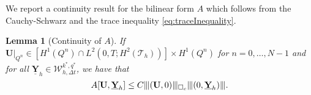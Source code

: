 \documentclass[sn-mathphys-num]{sn-jnl}
\newtheorem{lem}[thm]{Lemma}
\numberwithin{equation}{section}
\newcommand{\wop}{\square_c}
\newcommand{\tnorm}[1]{\vert\hspace{-0.3mm}\Vert#1\Vert\hspace{-0.3mm}\vert}
\newcommand{\dT}{\mathrm{d}t}
\newcommand{\ProdFullyDiscrSpace}[2]{ \mathcal{W}^{ {#1},{#2}}_{h, \Delta t  } }
\newcommand{\Yh}{\underline{\mathbf{Y}}_h}
\newcommand{\dt}{\partial_t}
\begin{document}
We report a continuity result for the bilinear form $A$ which follows from the Cauchy-Schwarz and the trace inequality \eqref{eq:traceInequality}. 
\begin{lem}[Continuity of $A$]\label{lem:continuityA}
If $\mathbf{U}|_{Q^n} \in [H^1(Q^n) \cap L^2(0,T;H^2(\mathcal{T}_h))] \times H^1(Q^n)$ for $n=0,\ldots,N-1$ and for all $\Yh \in \ProdFullyDiscrSpace{k^\ast}{q^\ast}$, we have that 
    \begin{equation*}
        A[\mathbf{U},\Yh] \le C \tnorm{(\mathbf{U}, 0)}_{\wop} \tnorm{(0,\Yh)}. 
    \end{equation*} 
\end{lem}
\begin{comment}
\begin{proof}
    First, note that $\tnorm{(0,\Yh)} = \Vert \Yh \Vert_{S_h^\ast}$. Using the Cauchy-Schwarz inequality, we obtain
    \begin{equation*}
        \sum_{n = 0}^{N-1} \left\{ (\dt u_2, \underline{y}_1)_{Q^n} + a(u_1,\underline{y}_1)_{Q^n} \right\} \le C \left( \sum_{n = 0}^{N-1} \Vert \dt u_2 \Vert^2_{Q^n} + \Vert c^2 \nabla u_1 \Vert^2_{Q^n} \right)^{1/2} \! \! \! \Vert \Yh \Vert_{S_h^{\ast}},
    \end{equation*}
    and 
    \begin{equation*}
        \sum_{n = 0}^{N-1} (\dt u_1 - u_2,\underline{y}_2)_{Q^n} \le C \left( \sum_{n = 0}^{N-1} \Vert \dt u_1 \Vert^2_{Q^n} + \Vert u_2 \Vert^2_{Q^n} \right)^{1/2} \Vert \Yh \Vert_{S_h^{\ast}}.
    \end{equation*}
    Since the interface $\Gamma$ is fitted by the triangulation, we have that $c^2 \nabla u_1 \in H^1(K)$ for each $K \in \mathcal{T}_h$. Thus, we can apply the trace inequality \eqref{eq:traceInequality} to obtain
    \begin{align*}
        \sum_{n = 0}^{N-1} (c^2 \nabla &u_1 \cdot n, \underline{y}_1)_{\Sigma^n} \\
        &\le \left( \sum_{n = 0}^{N-1} \int_{I_n} \sum_{K \in \mathcal{T}_h} h \Vert c^2 \nabla v \Vert_{\partial \Omega \cap \partial K}^2 \dT \right)^{1/2} \left( \sum_{n = 0}^{N-1} \int_{I_n} \sum_{K \in \mathcal{T}_h} h^{-1} \Vert \underline{y}_1 \Vert_{\partial \Omega \cap \partial K}^2 \dT \right)^{1/2} \\
        &\le C \left( \sum_{n = 0}^{N-1} \left\{ \Vert c^2 \nabla u_1 \Vert^2_{Q^n} + \int_{I_n} \sum_{K \in \mathcal{T}_h} h^2 \Vert c^2 u_1 \Vert_{H^2(K)} \dT \right\} \right)^{1/2} \Vert \Yh \Vert_{S_h^{\ast}}.
    \end{align*}
    Putting all estimates together, the claim follows. 
\end{proof}
\end{comment}
\end{document}
